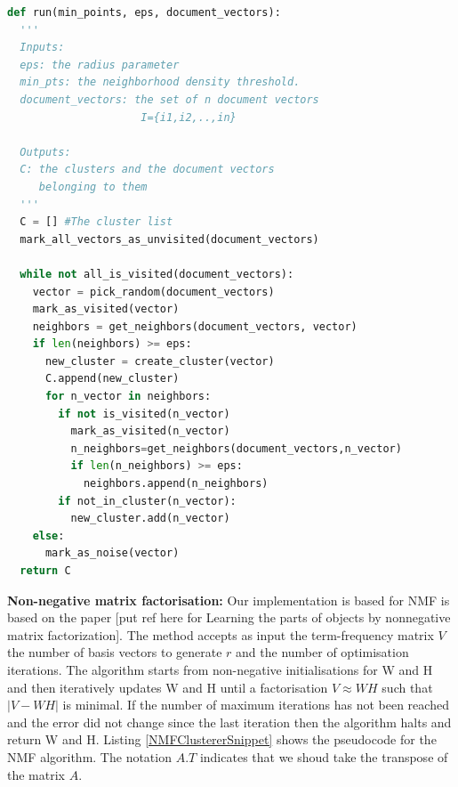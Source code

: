 \begin{lstlisting}[language=Python, label=DbscanClustererSnippet, caption=Pseudocode for DBSCAN algorithm]
def run(min_points, eps, document_vectors):
  '''
  Inputs: 
  eps: the radius parameter
  min_pts: the neighborhood density threshold.
  document_vectors: the set of n document vectors 
                     I={i1,i2,..,in}
  
  Outputs:
  C: the clusters and the document vectors 
     belonging to them
  '''
  C = [] #The cluster list
  mark_all_vectors_as_unvisited(document_vectors)
  
  while not all_is_visited(document_vectors):  
    vector = pick_random(document_vectors)
    mark_as_visited(vector)
    neighbors = get_neighbors(document_vectors, vector)
    if len(neighbors) >= eps:
      new_cluster = create_cluster(vector) 
      C.append(new_cluster)
      for n_vector in neighbors:
        if not is_visited(n_vector) 
          mark_as_visited(n_vector)
          n_neighbors=get_neighbors(document_vectors,n_vector)
          if len(n_neighbors) >= eps:
            neighbors.append(n_neighbors)
        if not_in_cluster(n_vector):
          new_cluster.add(n_vector)
    else:
      mark_as_noise(vector) 
  return C
\end{lstlisting}
\vspace{10 mm}
\textbf{Non-negative matrix factorisation:} Our implementation is based for NMF is based on the paper [put ref here for Learning the parts of objects by nonnegative matrix factorization]. The method accepts as input the term-frequency matrix $V$ the number of basis vectors to generate $r$ and the number of optimisation iterations. The algorithm starts from non-negative initialisations for W and H and then iteratively updates W and H until a factorisation $V \approx WH$ such that $| V - WH |$ is minimal. If the number of maximum iterations has not been reached and the error did not change since the last iteration then the algorithm halts and return W and H. Listing \ref{NMFClustererSnippet} shows the pseudocode for the NMF algorithm. The notation $A.T$ indicates that we shoud take the transpose of the matrix $A$.
  
